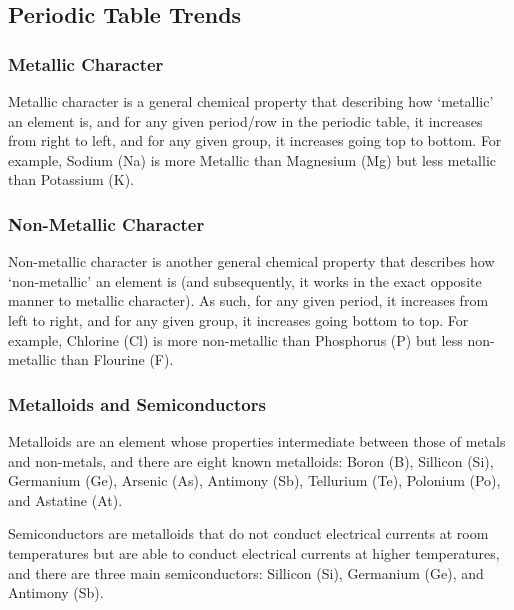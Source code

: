 \subsection{Periodic Table Trends}

\subsubsection{Metallic Character}

\begin{defn}
Metallic character is a general chemical property that describing how `metallic' an element is, and for any given period/row in the periodic table, it increases from right to left, and for any given group, it increases going top to bottom. For example, Sodium (Na) is more Metallic than Magnesium (Mg) but less metallic than Potassium (K).
\end{defn}

\subsubsection{Non-Metallic Character}

\begin{defn}
Non-metallic character is another general chemical property that describes how `non-metallic' an element is (and subsequently, it works in the exact opposite manner to metallic character). As such, for any given period, it increases from left to right, and for any given group, it increases going bottom to top. For example, Chlorine (Cl) is more non-metallic than Phosphorus (P) but less non-metallic than Flourine (F).
\end{defn}

\subsubsection{Metalloids and Semiconductors}

\begin{defn}
Metalloids are an element whose properties intermediate between those of metals and non-metals, and there are eight known metalloids: Boron (B), Sillicon (Si), Germanium (Ge), Arsenic (As), Antimony (Sb), Tellurium (Te), Polonium (Po), and Astatine (At).
\end{defn}

\noindent
{}

\begin{defn}
Semiconductors are metalloids that do not conduct electrical currents at room temperatures but are able to conduct electrical currents at higher temperatures, and there are three main semiconductors: Sillicon (Si), Germanium (Ge), and Antimony (Sb).
\end{defn}

